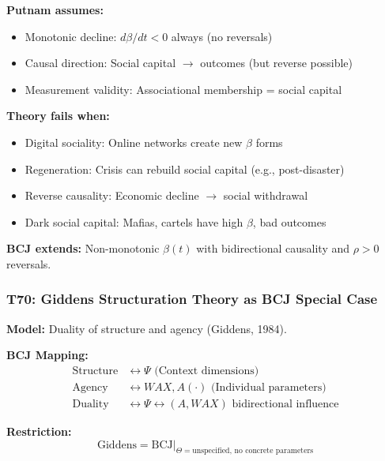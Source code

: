 \begin{tcolorbox}[colback=red!5!white, colframe=red!75!black,
    title=Boundary Condition: Where Putnam Fails]
\textbf{Putnam assumes:}
\begin{itemize}[nosep]
\item Monotonic decline: $d\beta/dt < 0$ always (no reversals)
\item Causal direction: Social capital $\to$ outcomes (but reverse possible)
\item Measurement validity: Associational membership = social capital
\end{itemize}

\textbf{Theory fails when:}
\begin{itemize}[nosep]
\item Digital sociality: Online networks create new $\beta$ forms
\item Regeneration: Crisis can rebuild social capital (e.g., post-disaster)
\item Reverse causality: Economic decline $\to$ social withdrawal
\item Dark social capital: Mafias, cartels have high $\beta$, bad outcomes
\end{itemize}

\textbf{BCJ extends:} Non-monotonic $\beta(t)$ with bidirectional causality and $\rho > 0$ reversals.
\end{tcolorbox}

\subsubsection*{T70: Giddens Structuration Theory as BCJ Special Case}

\textbf{Model:} Duality of structure and agency (Giddens, 1984).

\textbf{BCJ Mapping:}
\begin{align}
\text{Structure} &\leftrightarrow \Psi \text{ (Context dimensions)} \\
\text{Agency} &\leftrightarrow WAX, A(\cdot) \text{ (Individual parameters)} \\
\text{Duality} &\leftrightarrow \Psi \leftrightarrow (A, WAX) \text{ bidirectional influence}
\end{align}

\textbf{Restriction:}
\begin{equation}
\text{Giddens} = \text{BCJ} \big|_{\Theta = \text{unspecified}, \, \text{no concrete parameters}}
\end{equation}


